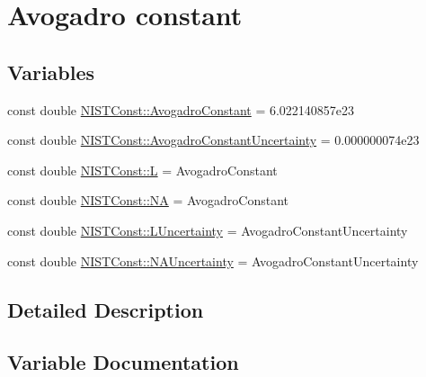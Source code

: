 \hypertarget{group___n_i_s_t_const-_avogadro_constant}{}\section{Avogadro constant}
\label{group___n_i_s_t_const-_avogadro_constant}
\subsection*{Variables}
\begin{DoxyCompactItemize}
\item 
const double \hyperlink{group___n_i_s_t_const-_avogadro_constant_gad82b2a4777628c4e67a87b8f5b99174e}{N\+I\+S\+T\+Const\+::\+Avogadro\+Constant} = 6.\+022140857e23
\item 
const double \hyperlink{group___n_i_s_t_const-_avogadro_constant_ga38f3e71e31d844bbfe2dfacf7100c4d1}{N\+I\+S\+T\+Const\+::\+Avogadro\+Constant\+Uncertainty} = 0.\+000000074e23
\item 
const double \hyperlink{group___n_i_s_t_const-_avogadro_constant_ga0d410e47da7c9d6841958899d80e4b75}{N\+I\+S\+T\+Const\+::L} = Avogadro\+Constant
\item 
const double \hyperlink{group___n_i_s_t_const-_avogadro_constant_gad08af58ac1b1ee41e25bd8564a74bc42}{N\+I\+S\+T\+Const\+::\+NA} = Avogadro\+Constant
\item 
const double \hyperlink{group___n_i_s_t_const-_avogadro_constant_ga76105d1e09dbaed0913932aa743ef03d}{N\+I\+S\+T\+Const\+::\+L\+Uncertainty} = Avogadro\+Constant\+Uncertainty
\item 
const double \hyperlink{group___n_i_s_t_const-_avogadro_constant_ga37f2994955ace9aed8e44bd3699f0b50}{N\+I\+S\+T\+Const\+::\+N\+A\+Uncertainty} = Avogadro\+Constant\+Uncertainty
\end{DoxyCompactItemize}


\subsection{Detailed Description}


\subsection{Variable Documentation}
\mbox{\label{group___n_i_s_t_const-_avogadro_constant_gad82b2a4777628c4e67a87b8f5b99174e}} 
